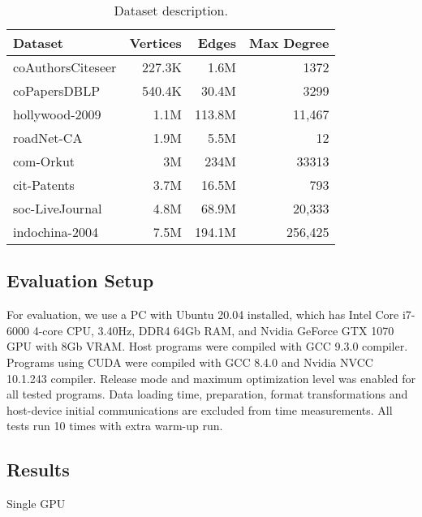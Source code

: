 \begin{table}[htbp]
\caption{Dataset description.} 
\begin{center}
    \begin{tabular}{|l|r|r|r|}
    \hline
    Dataset & Vertices  & Edges & Max Degree \\
    \hline
    \hline
    coAuthorsCiteseer & 227.3K &   1.6M &    1372 \\
    coPapersDBLP      & 540.4K &  30.4M &    3299 \\
    hollywood-2009    &   1.1M & 113.8M &  11,467 \\
    roadNet-CA        &   1.9M &   5.5M &      12 \\
    com-Orkut         &     3M &   234M &   33313 \\
    \hline
    cit-Patents       &   3.7M &  16.5M &     793 \\
    soc-LiveJournal   &   4.8M &  68.9M &  20,333 \\
    indochina-2004    &   7.5M & 194.1M & 256,425 \\
    \hline
    \end{tabular}
    \label{dataset:info}
\end{center}
\end{table}

\subsection{Evaluation Setup}

For evaluation, we use a PC with Ubuntu 20.04 installed, which has Intel Core i7-6000 4-core CPU, 3.40Hz, DDR4 64Gb RAM, and Nvidia GeForce GTX 1070 GPU with 8Gb VRAM. Host programs were compiled with GCC 9.3.0 compiler. Programs using CUDA were compiled with GCC 8.4.0 and Nvidia NVCC 10.1.243 compiler. Release mode and maximum optimization level was enabled for all tested programs. Data loading time, preparation, format transformations and host-device initial communications are excluded from time measurements. All tests run 10 times with extra warm-up run.

\subsection{Results}

Single GPU 

